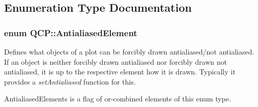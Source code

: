 \subsection{Enumeration Type Documentation}
\subsubsection[{\texorpdfstring{Antialiased\+Element}{AntialiasedElement}}]{\setlength{\rightskip}{0pt plus 5cm}enum {\bf Q\+C\+P\+::\+Antialiased\+Element}}\hypertarget{namespaceQCP_ae55dbe315d41fe80f29ba88100843a0c}{}\label{namespaceQCP_ae55dbe315d41fe80f29ba88100843a0c}
Defines what objects of a plot can be forcibly drawn antialiased/not antialiased. If an object is neither forcibly drawn antialiased nor forcibly drawn not antialiased, it is up to the respective element how it is drawn. Typically it provides a {\itshape set\+Antialiased} function for this.

{\ttfamily Antialiased\+Elements} is a flag of or-\/combined elements of this enum type.

